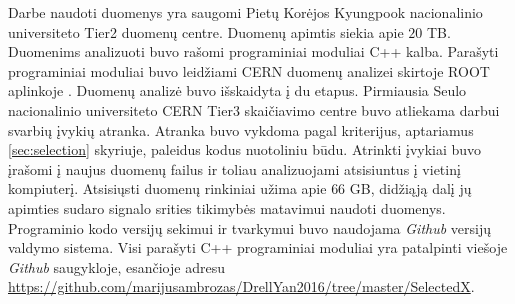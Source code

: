 \documentclass[a4paper, 12pt, oneside]{article}
\begin{document}
Darbe naudoti duomenys yra saugomi Pietų Korėjos Kyungpook nacionalinio universiteto Tier2 duomenų centre.
Duomenų apimtis siekia apie $20$ TB.
Duomenims analizuoti buvo rašomi programiniai moduliai C++ kalba.
Parašyti programiniai moduliai buvo leidžiami CERN duomenų analizei skirtoje ROOT aplinkoje \cite{ROOTarticle}.
Duomenų analizė buvo išskaidyta į du etapus.
Pirmiausia Seulo nacionalinio universiteto CERN Tier3 skaičiavimo centre buvo atliekama darbui svarbių įvykių atranka.
Atranka buvo vykdoma pagal kriterijus, aptariamus \ref{sec:selection} skyriuje, paleidus kodus nuotoliniu būdu.
Atrinkti įvykiai buvo įrašomi į naujus duomenų failus ir toliau analizuojami atsisiuntus į vietinį kompiuterį.
Atsisiųsti duomenų rinkiniai užima apie $66$ GB, didžiąją dalį jų apimties sudaro signalo srities tikimybės matavimui
naudoti duomenys.
Programinio kodo versijų sekimui ir tvarkymui buvo naudojama \textit{Github} versijų valdymo sistema.
Visi parašyti C++ programiniai moduliai yra patalpinti viešoje \textit{Github} saugykloje, esančioje adresu
\url{https://github.com/marijusambrozas/DrellYan2016/tree/master/SelectedX}.
\end{document}
